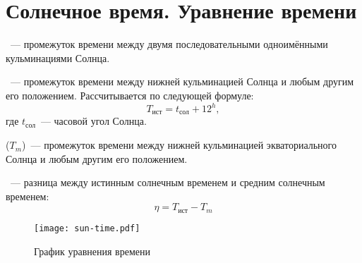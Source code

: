 \section{Солнечное время. Уравнение времени}
~--- промежуток времени между двумя последовательными одноимёнными кульминациями Солнца.

~--- промежуток времени между нижней кульминацией Солнца и любым другим его положением. Рассчитывается по следующей формуле:
\begin{equation}
T_{\text{ист}}=t_{\text{сол}}+12^h,
\end{equation}
где $t_{\text{сол}}$~--- часовой угол Солнца.

 ($T_m$)~--- промежуток времени между нижней кульминацией экваториального Солнца и любым другим его положением.

~--- разница между истинным солнечным временем и средним солнечным временем:
\begin{equation}
\eta=T_{\text{ист}}-T_m
\end{equation}

\centering
 \begin{figure}[!h]
  \centering
  \texttt{[image: sun-time.pdf]}
  \caption{График уравнения времени}
 \end{figure}